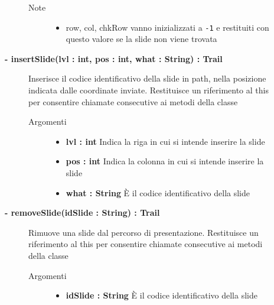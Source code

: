 \begin{description}
\begin{description}
\begin{description}
\begin{itemize}
				\end{itemize}
			\item[Note] \hfill
			\begin{itemize}
					\item row, col, chkRow vanno inizializzati a \texttt{-1} e restituiti con questo valore se la slide non viene trovata
			\end{itemize}
		\end{description}
	\end{description}
	
	\begin{description}
		\item[\textbf{\color{blue}- insertSlide(lvl : int, pos : int, what : String) : Trail			}] \hfill
			Inserisce il codice identificativo della slide in path, nella posizione indicata dalle coordinate inviate. Restituisce un riferimento al this per consentire chiamate consecutive ai metodi della classe
			
		\begin{description}
			\item[Argomenti] \hfill
				\begin{itemize}
				
					\item \textbf{lvl : int		} \hfill
					Indica la riga in cui si intende inserire la slide
					\item \textbf{pos : int		} \hfill
					Indica la colonna in cui si intende inserire la slide
					\item \textbf{what : String		} \hfill
					È il codice identificativo della slide 
					
				\end{itemize}
			
		\end{description}
	\end{description}
	
	\begin{description}
		\item[\textbf{\color{blue}- removeSlide(idSlide : String) : Trail			}] \hfill
			Rimuove una slide dal percorso di presentazione. Restituisce un riferimento al this per consentire chiamate consecutive ai metodi della classe
			
		\begin{description}
			\item[Argomenti] \hfill
				\begin{itemize}
					\item \textbf{idSlide : String		} \hfill
					È il codice identificativo della slide 
					

\end{itemize}
\end{description}
\end{description}
\end{description}
